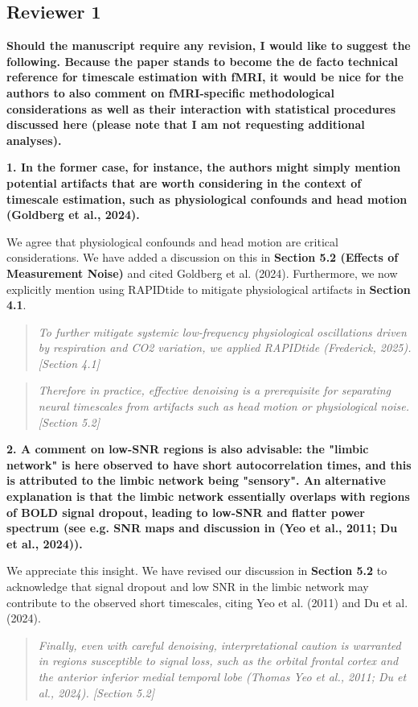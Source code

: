 \documentclass[docs/main.tex]{subfiles}
\newcommand{\reviewercomment}[1]{\vspace{0.3cm}\noindent\textbf{#1}\vspace{0.15cm}}
\newcommand{\manuscriptquote}[1]{\begin{quote}\textit{#1}\end{quote}}
\begin{document}
\subsection*{Reviewer 1}

\reviewercomment{Should the manuscript require any revision, I would like to suggest the following. Because the paper stands to become the de facto technical reference for timescale estimation with fMRI, it would be nice for the authors to also comment on fMRI-specific methodological considerations as well as their interaction with statistical procedures discussed here (please note that I am not requesting additional analyses).}

\reviewercomment{1. In the former case, for instance, the authors might simply mention potential artifacts that are worth considering in the context of timescale estimation, such as physiological confounds and head motion (Goldberg et al., 2024).}

We agree that physiological confounds and head motion are critical considerations. We have added a discussion on this in \textbf{Section 5.2 (Effects of Measurement Noise)} and cited Goldberg et al. (2024). Furthermore, we now explicitly mention using RAPIDtide to mitigate physiological artifacts in \textbf{Section 4.1}.

\manuscriptquote{To further mitigate systemic low-frequency physiological oscillations driven by respiration and CO2 variation, we applied RAPIDtide (Frederick, 2025). [Section 4.1]}

\manuscriptquote{Therefore in practice, effective denoising is a prerequisite for separating neural timescales from artifacts such as head motion or physiological noise. [Section 5.2]}

\reviewercomment{2. A comment on low-SNR regions is also advisable: the "limbic network" is here observed to have short autocorrelation times, and this is attributed to the limbic network being "sensory". An alternative explanation is that the limbic network essentially overlaps with regions of BOLD signal dropout, leading to low-SNR and flatter power spectrum (see e.g. SNR maps and discussion in (Yeo et al., 2011; Du et al., 2024)).}

We appreciate this insight. We have revised our discussion in \textbf{Section 5.2} to acknowledge that signal dropout and low SNR in the limbic network may contribute to the observed short timescales, citing Yeo et al. (2011) and Du et al. (2024).

\manuscriptquote{Finally, even with careful denoising, interpretational caution is warranted in regions susceptible to signal loss, such as the orbital frontal cortex and the anterior inferior medial temporal lobe (Thomas Yeo et al., 2011; Du et al., 2024). [Section 5.2]}
\end{document}
